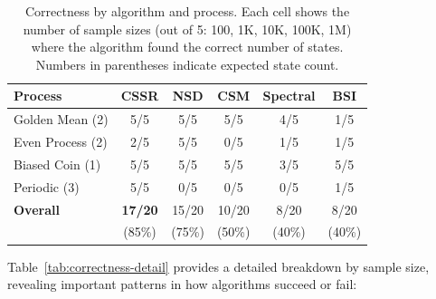 \documentclass[11pt,a4paper]{report}
\theoremstyle{definition}
\theoremstyle{plain}
\begin{document}
\begin{table}[htbp]
\centering
\begin{tabular}{lccccc}
\toprule
\textbf{Process} & \textbf{CSSR} & \textbf{NSD} & \textbf{CSM} & \textbf{Spectral} & \textbf{BSI} \\
\midrule
Golden Mean (2) & 5/5 & 5/5 & 5/5 & 4/5 & 1/5 \\
Even Process (2) & 2/5 & 5/5 & 0/5 & 1/5 & 1/5 \\
Biased Coin (1) & 5/5 & 5/5 & 5/5 & 3/5 & 5/5 \\
Periodic (3) & 5/5 & 0/5 & 0/5 & 0/5 & 1/5 \\
\midrule
\textbf{Overall} & \textbf{17/20} & 15/20 & 10/20 & 8/20 & 8/20 \\
 & (85\%) & (75\%) & (50\%) & (40\%) & (40\%) \\
\bottomrule
\end{tabular}
\caption{Correctness by algorithm and process. Each cell shows the number of sample sizes (out of 5: 100, 1K, 10K, 100K, 1M) where the algorithm found the correct number of states. Numbers in parentheses indicate expected state count.}
\label{tab:correctness}
\end{table}

Table~\ref{tab:correctness-detail} provides a detailed breakdown by sample size, revealing important patterns in how algorithms succeed or fail:
\end{document}
